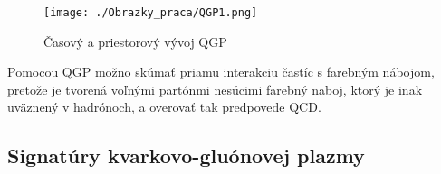 \documentclass[thesismargins, thesislinespacing]{rnthesis}
\begin{document}
\begin{figure}[hbtp!]
	\begin{center}
		\texttt{[image: ./Obrazky\_praca/QGP1.png]}
		\caption{ Časový a priestorový vývoj QGP \cite{vyvoj}}
		\label{QGP}
	\end{center}
\end{figure}  

Pomocou QGP možno skúmať priamu interakciu častíc s  farebným nábojom, pretože je tvorená voľnými partónmi nesúcimi farebný naboj, ktorý je inak uväznený v hadrónoch, a overovať tak predpovede QCD. 

\subsection{Signatúry kvarkovo-gluónovej plazmy} 
\end{document}
